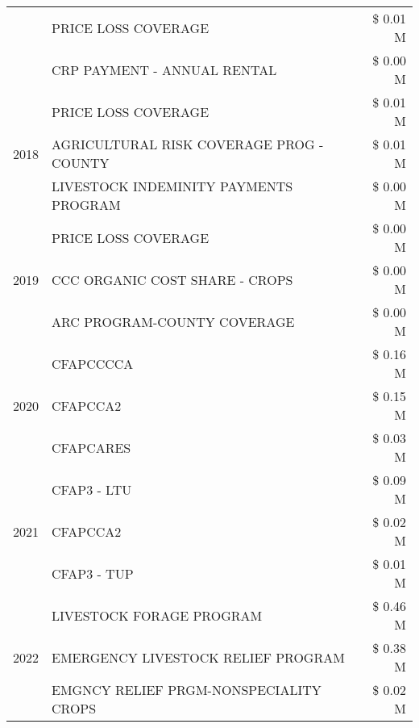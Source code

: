 \begin{tabular}{llr}
 & PRICE LOSS COVERAGE & \$ 0.01 M \\
 & CRP PAYMENT - ANNUAL RENTAL & \$ 0.00 M \\
\cline{1-3}
\multirow[t]{3}{*}{2018} & PRICE LOSS COVERAGE & \$ 0.01 M \\
 & AGRICULTURAL RISK COVERAGE PROG - COUNTY & \$ 0.01 M \\
 & LIVESTOCK INDEMINITY PAYMENTS PROGRAM & \$ 0.00 M \\
\cline{1-3}
\multirow[t]{3}{*}{2019} & PRICE LOSS COVERAGE & \$ 0.00 M \\
 & CCC ORGANIC COST SHARE - CROPS & \$ 0.00 M \\
 & ARC PROGRAM-COUNTY COVERAGE & \$ 0.00 M \\
\cline{1-3}
\multirow[t]{3}{*}{2020} & CFAPCCCCA & \$ 0.16 M \\
 & CFAPCCA2 & \$ 0.15 M \\
 & CFAPCARES & \$ 0.03 M \\
\cline{1-3}
\multirow[t]{3}{*}{2021} & CFAP3 - LTU & \$ 0.09 M \\
 & CFAPCCA2 & \$ 0.02 M \\
 & CFAP3 - TUP & \$ 0.01 M \\
\cline{1-3}
\multirow[t]{3}{*}{2022} & LIVESTOCK FORAGE PROGRAM & \$ 0.46 M \\
 & EMERGENCY LIVESTOCK RELIEF PROGRAM & \$ 0.38 M \\
 & EMGNCY RELIEF PRGM-NONSPECIALITY CROPS & \$ 0.02 M \\
\cline{1-3}
\bottomrule
\end{tabular}

